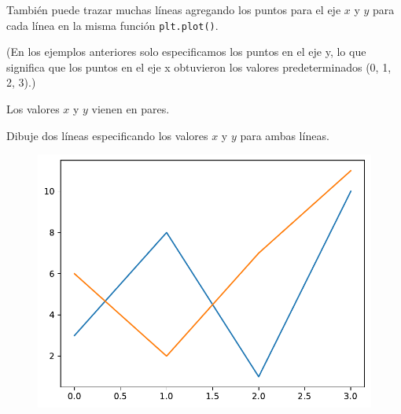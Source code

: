 También puede trazar muchas líneas agregando los puntos para el eje
\(x\) y \(y\) para cada línea en la misma función \texttt{plt.plot()}.

(En los ejemplos anteriores solo especificamos los puntos en el eje y,
lo que significa que los puntos en el eje x obtuvieron los valores
predeterminados (0, 1, 2, 3).)

Los valores \(x\) y \(y\) vienen en pares.\\

\begin{code} Dibuje dos líneas especificando los valores \(x\) y \(y\) para ambas líneas.

\begin{Shaded}
\begin{Highlighting}[]

\OperatorTok{=}\NormalTok{ np.array([}\NormalTok{, }\NormalTok{, }\NormalTok{, }\NormalTok{])}
\OperatorTok{=}\NormalTok{ np.array([}\NormalTok{, }\NormalTok{, }\NormalTok{, }\NormalTok{])}
\OperatorTok{=}\NormalTok{ np.array([}\NormalTok{, }\NormalTok{, }\NormalTok{, }\NormalTok{])}
\OperatorTok{=}\NormalTok{ np.array([}\NormalTok{, }\NormalTok{, }\NormalTok{, }\NormalTok{])}

\end{Highlighting}
\end{Shaded}

\begin{figure}
  \centering
  \includegraphics[scale=0.6]{img/grafica1022.pdf}
\end{figure}

\end{code}

